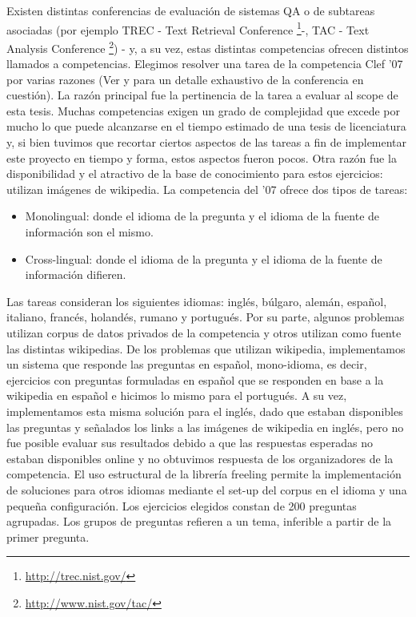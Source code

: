 Existen distintas conferencias de evaluación de sistemas QA o de subtareas asociadas (por ejemplo TREC - Text Retrieval Conference \footnote{\url{http://trec.nist.gov/}}-, TAC - Text Analysis Conference \footnote{\url{http://www.nist.gov/tac/}}) - y, a su vez, estas distintas competencias ofrecen distintos llamados a competencias. Elegimos resolver una tarea de la competencia Clef '07  por varias razones (Ver \cite{GuidelineClef07} y \cite{OverviewClef07} para un detalle exhaustivo de la conferencia en cuestión). La razón principal fue la pertinencia de la tarea a evaluar al scope de esta tesis. Muchas competencias exigen un grado de complejidad que excede por mucho lo que puede alcanzarse en el tiempo estimado de una tesis de licenciatura y, si bien tuvimos que recortar ciertos aspectos de las tareas a fin de implementar este proyecto en tiempo y forma, estos aspectos fueron pocos.
Otra razón fue la disponibilidad y el atractivo de la base de conocimiento para estos ejercicios: utilizan imágenes de wikipedia.
La competencia del '07 ofrece dos tipos de tareas:
\begin{itemize}
\item Monolingual: donde el idioma de la pregunta y el idioma de la fuente de información son el mismo.
\item Cross-lingual: donde el idioma de la pregunta y el idioma de la fuente de información difieren.
\end{itemize}
Las tareas consideran los siguientes idiomas: inglés, búlgaro, alemán, español, italiano, francés, holandés, rumano y portugués. Por su parte, algunos problemas utilizan corpus de datos privados de la competencia y otros utilizan como fuente las distintas wikipedias. De los problemas que utilizan
wikipedia, implementamos un sistema que responde las preguntas en español, mono-idioma, es decir, ejercicios con preguntas formuladas en español que se responden en base a la wikipedia en español e hicimos lo mismo para el portugués. A su vez, implementamos esta misma solución para el inglés, dado que estaban disponibles las preguntas y señalados los links a las imágenes de wikipedia en inglés, pero no fue posible evaluar sus resultados debido a que las respuestas esperadas no estaban disponibles online y no obtuvimos respuesta de los organizadores de la competencia. El uso estructural de la librería freeling permite la implementación de soluciones para otros idiomas mediante el set-up del corpus en el idioma y una pequeña configuración.
Los ejercicios elegidos constan de 200 preguntas agrupadas. Los grupos de preguntas refieren a un tema, inferible a partir de la primer pregunta.
